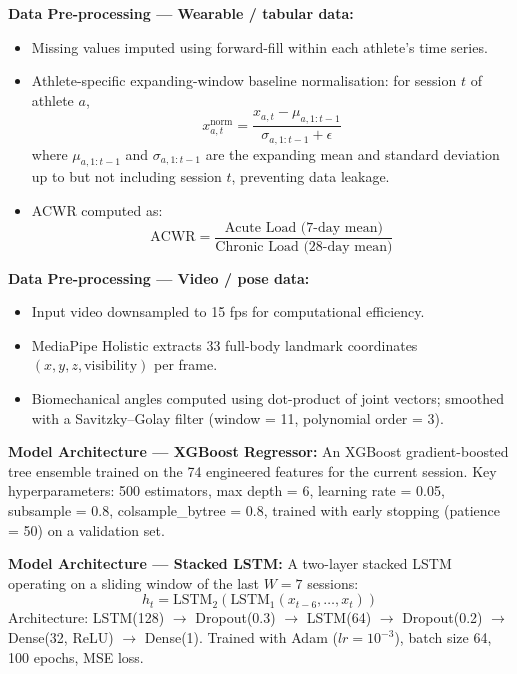 \documentclass[12pt,a4paper]{report}
\begin{document}
\textbf{Data Pre-processing — Wearable / tabular data:}
\begin{itemize}
  \item Missing values imputed using forward-fill within each athlete's time series.
  \item Athlete-specific expanding-window baseline normalisation: for session $t$ of athlete $a$,
        \begin{equation}\label{eq:norm}
          x_{a,t}^{\text{norm}} = \frac{x_{a,t} - \mu_{a,1:t-1}}{\sigma_{a,1:t-1} + \epsilon}
        \end{equation}
        where $\mu_{a,1:t-1}$ and $\sigma_{a,1:t-1}$ are the expanding mean and standard deviation up to but not including session $t$, preventing data leakage.
  \item ACWR computed as:
        \begin{equation}\label{eq:acwr}
          \text{ACWR} = \frac{\text{Acute Load (7-day mean)}}{\text{Chronic Load (28-day mean)}}
        \end{equation}
\end{itemize}

\textbf{Data Pre-processing — Video / pose data:}
\begin{itemize}
  \item Input video downsampled to 15 fps for computational efficiency.
  \item MediaPipe Holistic extracts 33 full-body landmark coordinates $(x, y, z, \text{visibility})$ per frame.
  \item Biomechanical angles computed using dot-product of joint vectors; smoothed with a Savitzky--Golay filter (window = 11, polynomial order = 3).
\end{itemize}

\textbf{Model Architecture — XGBoost Regressor:}
An XGBoost gradient-boosted tree ensemble trained on the 74 engineered features for the current session. Key hyperparameters: 500 estimators, max depth = 6, learning rate = 0.05, subsample = 0.8, colsample\_bytree = 0.8, trained with early stopping (patience = 50) on a validation set.

\textbf{Model Architecture — Stacked LSTM:}
A two-layer stacked LSTM operating on a sliding window of the last $W = 7$ sessions:
\begin{equation}\label{eq:lstm}
  h_t = \text{LSTM}_2(\text{LSTM}_1(x_{t-6}, \ldots, x_t))
\end{equation}
Architecture: LSTM(128) $\rightarrow$ Dropout(0.3) $\rightarrow$ LSTM(64) $\rightarrow$ Dropout(0.2) $\rightarrow$ Dense(32, ReLU) $\rightarrow$ Dense(1). Trained with Adam ($lr = 10^{-3}$), batch size 64, 100 epochs, MSE loss.
\end{document}
